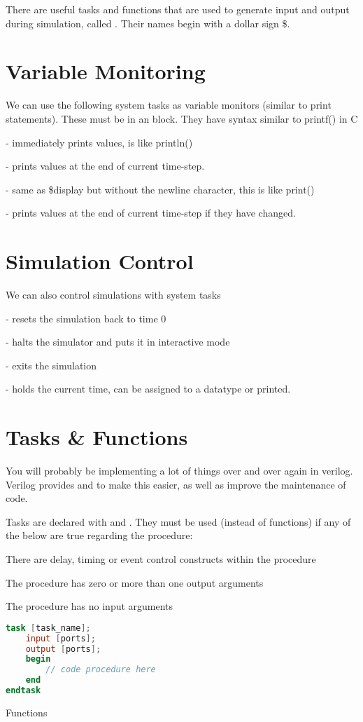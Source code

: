 There are useful tasks and functions that are used to generate input and output during simulation, called . Their names begin with a dollar sign \$.

\section{Variable Monitoring}
We can use the following system tasks as variable monitors (similar to print statements). These must be in an  block. They have syntax similar to printf() in C
\begin{bullets}
	\item {} - immediately prints values, is like println()
	\item {} - prints values at the end of current time-step.
	\item {} - same as \$display but without the newline character, this is like print()
	\item {} - prints values at the end of current time-step if they have changed.
\end{bullets}

\section{Simulation Control}
We can also control simulations with system tasks
\begin{bullets}
	\item {} - resets the simulation back to time 0
	\item {} - halts the simulator and puts it in interactive mode
	\item {} - exits the simulation
	\item {} - holds the current time, can be assigned to a  datatype or printed.
\end{bullets}

\section{Tasks \& Functions}
You will probably be implementing a lot of things over and over again in verilog. Verilog provides  and  to make this easier, as well as improve the maintenance of code.

Tasks are declared with  and . They must be used (instead of functions) if any of the below are true regarding the procedure:
\begin{bullets}
	\item There are delay, timing or event control constructs within the procedure
	\item The procedure has zero or more than one output arguments
	\item The procedure has no input arguments
\end{bullets}

\begin{marginfigure}[-20em]\begin{lstlisting}[language=Verilog, caption={Task Declaration Syntax}]
task [task_name];
	input [ports];
	output [ports];
	begin
		// code procedure here
	end
endtask	
\end{lstlisting}\end{marginfigure}

Functions